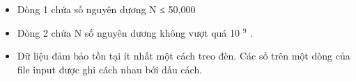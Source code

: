 \begin{itemize}
	\item     Dòng 1 chứa số nguyên dương N ≤ 50,000   
	\item     Dòng 2 chứa N số nguyên dương không vượt quá 10    $^     9    $    .   
	\item     Dữ liệu đảm bảo tồn tại ít nhất một cách treo đèn. Các số trên một dòng của file input được ghi cách nhau bởi dấu cách.   
\end{itemize}

\